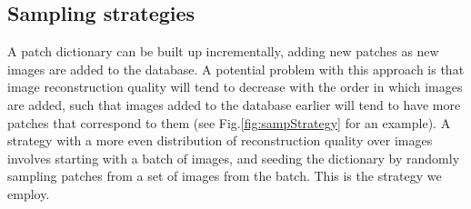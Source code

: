 \subsection{Sampling strategies}

A patch dictionary can be built up incrementally, adding new patches as new images are added to the database. A potential problem with this approach is that image reconstruction quality will tend to decrease with the order in which images are added, such that images added to the database earlier will tend to have more patches that correspond to them (see Fig.\ref{fig:sampStrategy} for an example). A strategy with a more even distribution of reconstruction quality over images involves starting with a batch of images, and seeding the dictionary by randomly sampling patches from a set of images from the batch. This is the strategy we employ. 

